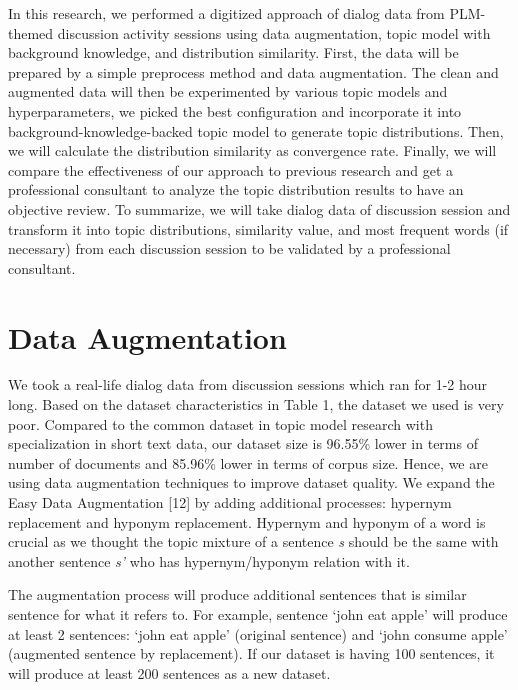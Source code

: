\documentclass[senior]{IPSstyle}
\begin{document}
In this research, we performed a digitized approach of dialog data from PLM-themed discussion activity sessions using data augmentation, topic model with background knowledge, and distribution similarity. First, the data will be prepared by a simple preprocess method and data augmentation. The clean and augmented data will then be experimented by various topic models and hyperparameters, we picked the best configuration and incorporate it into background-knowledge-backed topic model to generate topic distributions. Then, we will calculate the distribution similarity as convergence rate. Finally, we will compare the effectiveness of our approach to previous research and get a professional consultant to analyze the topic distribution results to have an objective review. To summarize, we will take dialog data of discussion session and transform it into topic distributions, similarity value, and most frequent words (if necessary) from each discussion session to be validated by a professional consultant.

\section{Data Augmentation}

We took a real-life dialog data from discussion sessions which ran for 1-2 hour long. Based on the dataset characteristics in Table 1, the dataset we used is very poor. Compared to the common dataset in topic model research with specialization in short text data, our dataset size is 96.55\% lower in terms of number of documents and 85.96\% lower in terms of corpus size. Hence, we are using data augmentation techniques to improve dataset quality. We expand the Easy Data Augmentation [12] by adding additional processes: hypernym replacement and hyponym replacement. Hypernym and hyponym of a word is crucial as we thought the topic mixture of a sentence \textit{s} should be the same with another sentence \textit{s’} who has hypernym/hyponym relation with it.

The augmentation process will produce additional sentences that is similar sentence for what it refers to. For example, sentence ‘john eat apple’ will produce at least 2 sentences: ‘john eat apple’ (original sentence) and ‘john consume apple’ (augmented sentence by replacement). If our dataset is having 100 sentences, it will produce at least 200 sentences as a new dataset.
\end{document}
